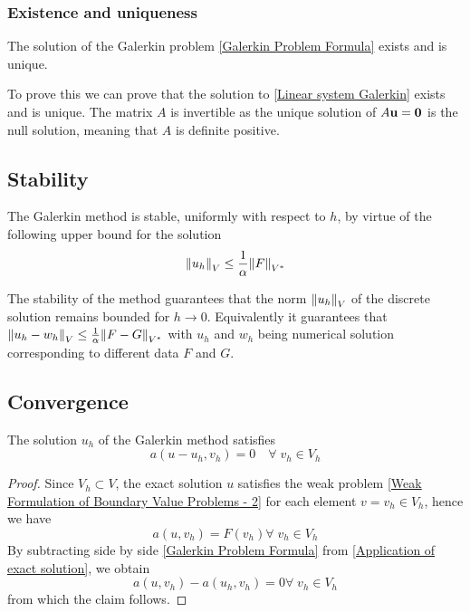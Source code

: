 \subsubsection*{Existence and uniqueness}
\begin{background}
    \begin{corollary}
    The solution of the Galerkin problem \eqref{Galerkin Problem Formula} exists and is unique.
\end{corollary}
\end{background}
To prove this we can prove that the solution to \eqref{Linear system Galerkin} exists and is unique. The matrix \(A\) is invertible as the unique solution of \(A\textbf{u} = \textbf{0}\) is the null solution, meaning that \(A\) is definite positive.
\subsection*{Stability}
\begin{corollary}
    The Galerkin method is stable, uniformly with respect to \(h\), by virtue of the following upper bound for the solution
    \[
        \norm{u_h}_V \leq \frac{1}{\alpha}\norm{F}_{V^*}
    \]
\end{corollary}
The stability of the method guarantees that the norm \(\norm{u_h}_V\) of the discrete solution remains bounded for \(h \to 0\). Equivalently it guarantees that \(\norm{u_h-w_h}_V \leq \frac{1}{\alpha}\norm{F-G}_{V^*}\) with \(u_h\) and \(w_h\) being numerical solution corresponding to different data \(F\) and \(G\).
\subsection*{Convergence}
\begin{background}
    \begin{lemma}
    The solution \(u_h\) of the Galerkin method satisfies 
    \begin{equation}
        a(u-u_h, v_h) = 0 \quad \forall \; v_h \in V_h \label{Galerkin orthogonality}
    \end{equation}
\end{lemma}

\begin{proof}
    Since \(V_h \subset V\), the exact solution \(u\) satisfies the weak problem \eqref{Weak Formulation of Boundary Value Problems - 2} for each element \(v = v_h \in V_h\), hence we have 
    \begin{equation}
        a(u, v_h) = F(v_h) \forall \; v_h \in V_h \label{Application of exact solution}
    \end{equation}
    By subtracting side by side \eqref{Galerkin Problem Formula} from \eqref{Application of exact solution}, we obtain 
    \[
        a(u,v_h)-a(u_h, v_h) = 0 \forall \; v_h \in V_h
    \]
    from which the claim follows.
\end{proof}
\end{background}

